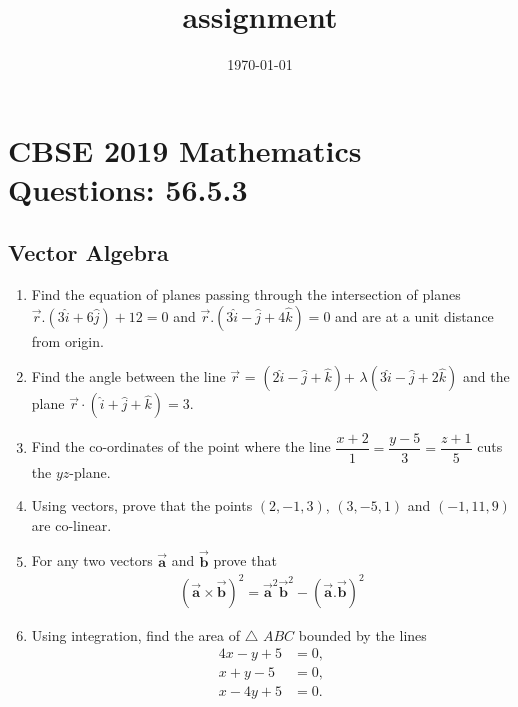 \documentclass[12pt,-letter paper]{article}
\let\vec\mathbf{}
\let\vec\mathbf{}
\let\vec\mathbf{}
\providecommand{\brak}[1]{\ensuremath{\left(#1\right)}}
\begin{document}
\title{assignment}
\date{\today}
\maketitle
\section*{CBSE 2019 Mathematics Questions: 56.5.3}
\subsection*{ Vector Algebra}
\begin{enumerate}
\item Find the equation of planes passing through the intersection of planes$ \overrightarrow r.\brak{3\hat{i}+6\hat{j}}+12=0$ and $ \overrightarrow {r}.\brak{3\hat{i}-\hat{j}+4\hat{k}}=0$ and are at a unit distance from origin.                         
\item  Find the angle between the line $\overrightarrow{r}$ = $\brak{2\hat{i}-\hat{j}+\hat{k}}$+ $\lambda\brak{3\hat{i}-\hat{j}+2\hat{k}}$ and the plane $\overrightarrow{r}\cdot\brak{\hat{i} +\hat{j}+\hat{k}}=3$.
\item Find the co-ordinates of the point where the line $\dfrac{x+2}{1}=\dfrac{y-5}{3}=\dfrac{z+1}{5}$ cuts the $yz$-plane.
\item Using vectors, prove that the points $\brak{2,-1,3}$, $\brak{3,-5,1}$ and $\brak{-1,11,9}$ are co-linear.
\item For any two vectors $\overrightarrow{\vec{a}}$ and $\overrightarrow{\vec{b}}$ prove that 
	\begin{align*}	\brak{\overrightarrow{\vec{a}}\times\overrightarrow{\vec{b}}}^{2}=\overrightarrow{\vec{a}}^{2}\overrightarrow{\vec{b}}^{2}-\brak{\overrightarrow{\vec{a}}.\overrightarrow{\vec{b}}}^{2}
	\end{align*}                 
 \item Using integration, find the area of $\triangle$ $ABC$ bounded by the lines
\begin{align*}
4x-y+5&=0,\\x+y-5&=0,\\x-4y+5&=0.
\end{align*} 

\end{enumerate}
\end{document}
